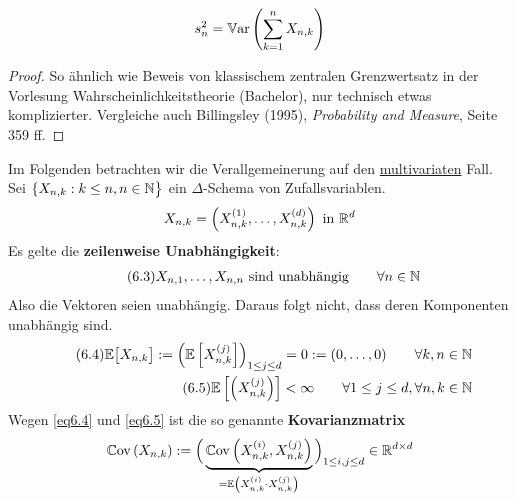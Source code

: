 \begin{bemerkung}
	\begin{align*}
		s_n^2=\mathbb{V}\text{ar}\left(\sum\limits_{k=1}^n X_{n,k}\right)
	\end{align*}
\end{bemerkung}

\begin{proof}
	So ähnlich wie Beweis von klassischem zentralen Grenzwertsatz in der Vorlesung Wahrscheinlichkeitstheorie (Bachelor), nur technisch etwas komplizierter. 
	Vergleiche auch Billingsley (1995), \textit{Probability and Measure}, Seite 359 ff.
\end{proof}

Im Folgenden betrachten wir die Verallgemeinerung auf den \underline{multivariaten} Fall.\\
Sei $\lbrace X_{n,k}:k\leq n,n\in\mathbb{N}\big\rbrace$ ein $\Delta$-Schema von Zufallsvariablen.
\begin{align*}
	X_{n,k}=\left(X_{n,k}^{(1)},\ldots,X_{n,k}^{(d)}\right)\text{ in }\mathbb{R}^d
\end{align*}
Es gelte die \textbf{zeilenweise Unabhängigkeit}:
\begin{align}\label{eq6.3}\tag{6.3}
	X_{n,1},\ldots,X_{n,n}\text{ sind unabhängig}\qquad\forall n\in\mathbb{N}
\end{align}
Also die Vektoren seien unabhängig. Daraus folgt nicht, dass deren Komponenten unabhängig sind.
\begin{align}\label{eq6.4}\tag{6.4}
	\mathbb{E}\big[X_{n,k}\big]:=\left(\mathbb{E}\left[X_{n,k}^{(j)}\right]\right)_{1\leq j\leq d}=0:=(0,\ldots,0)\qquad\forall k,n\in\mathbb{N}\\
	\label{eq6.5}\tag{6.5}
	\mathbb{E}\left[\left(X_{n,k}^{(j)}\right)\right]<\infty\qquad\forall 1\leq j\leq d,\forall n,k\in\mathbb{N}
\end{align}
Wegen \eqref{eq6.4} und \eqref{eq6.5} ist die so genannte \textbf{Kovarianzmatrix}
\begin{align*}
	\mathbb{C}\text{ov}\left(X_{n,k}\right):=\Big(\underbrace{\mathbb{C}\text{ov}\left(X_{n,k}^{(i)},X_{n,k}^{(j)}\right)}_{=\mathbb{E}\left(X_{n,k}^{(i)}\cdot X_{n,k}^{(j)}\right)}\Big)_{1\leq i,j\leq d}\in\mathbb{R}^{d\times d}
\end{align*}

